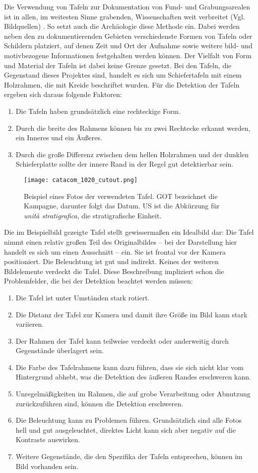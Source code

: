 Die Verwendung von Tafeln zur Dokumentation von Fund- und Grabungsarealen ist in allen, im weitesten Sinne grabenden, Wissenschaften weit verbreitet (Vgl. Bildquellen) . So setzt auch die Archäologie diese Methode ein. Dabei werden neben den zu dokumentierenden Gebieten verschiedenste Formen von Tafeln oder Schildern platziert, auf denen Zeit und Ort der Aufnahme sowie weitere bild- und motivbezogene Informationen festgehalten werden können. Der Vielfalt von Form und Material der Tafeln ist dabei keine Grenze gesetzt.
Bei den Tafeln, die Gegenstand dieses Projektes sind, handelt es sich um Schiefertafeln mit einem Holzrahmen, die mit Kreide beschriftet wurden. Für die Detektion der Tafeln ergeben sich daraus folgende Faktoren:\\
\begin{enumerate}
\item Die Tafeln haben grundsätzlich eine rechteckige Form.
\item Durch die breite des Rahmens können bis zu zwei Rechtecke erkannt werden, ein Inneres und ein Äußeres.
\item Durch die große Differenz zwischen dem hellen Holzrahmen und der dunklen Schieferplatte sollte der innere Rand in der Regel gut detektierbar sein.
\end{enumerate}
\begin{SCfigure}[0.5][h!]
\caption{Beispiel eines Fotos der verwendeten Tafel. GOT bezeichnet die Kampagne, darunter folgt das Datum. US ist die Abkürzung für \textit{unità stratigrafica}, die stratigrafische Einheit.}
\texttt{[image: catacom\_1020\_cutout.png]}
\end{SCfigure}
Die im Beispielbild gezeigte Tafel stellt gewissermaßen ein Idealbild dar: Die Tafel nimmt einen relativ großen Teil des Originalbildes -- bei der Darstellung hier handelt es sich um einen Ausschnitt -- ein. Sie ist frontal vor der Kamera positioniert. Die Beleuchtung ist gut und indirekt. Keines der weiteren Bildelemente verdeckt die Tafel.
Diese Beschreibung impliziert schon die Problemfelder, die bei der Detektion beachtet werden müssen:
\begin{enumerate}
\item Die Tafel ist unter Umständen stark rotiert.
\item Die Distanz der Tafel zur Kamera und damit ihre Größe im Bild kann stark variieren.
\item Der Rahmen der Tafel kann teilweise verdeckt oder anderweitig durch Gegenstände überlagert sein.
\item Die Farbe des Tafelrahmens kann dazu führen, dass sie sich nicht klar vom Hintergrund abhebt, was die Detektion des äußeren Randes erschweren kann.
\item Unregelmäßigkeiten im Rahmen, die auf grobe Verarbeitung oder Abnutzung zurückzuführen sind, können die Detektion erschweren.
\item Die Beleuchtung kann zu Problemen führen. Grundsätzlich sind alle Fotos hell und gut ausgeleuchtet, direktes Licht kann sich aber negativ auf die Kontraste auswirken.
\item Weitere Gegenstände, die den Spezifika der Tafeln entsprechen, können im Bild vorhanden sein.
\end{enumerate}
